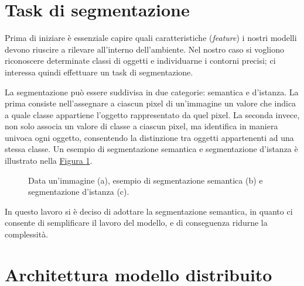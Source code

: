 \documentclass[12pt]{report}
\begin{document}
\section{Task di segmentazione}
\label{sec:task_di_segmentazione}

Prima di iniziare è essenziale capire quali caratteristiche (\textit{feature}) i nostri modelli devono riuscire a rilevare all'interno dell'ambiente. Nel nostro caso si vogliono riconoscere determinate classi di oggetti e individuarne i contorni precisi; ci interessa quindi effettuare un task di segmentazione.

La segmentazione può essere suddivisa in due categorie: semantica e d'istanza. La prima consiste nell'assegnare a ciascun pixel di un'immagine un valore che indica a quale classe appartiene l'oggetto rappresentato da quel pixel. La seconda invece, non solo associa un valore di classe a ciascun pixel, ma identifica in maniera univoca ogni oggetto, consentendo la distinzione tra oggetti appartenenti ad una stessa classe. Un esempio di segmentazione semantica e segmentazione d'istanza è illustrato nella \hyperref[fig:segmentazione]{Figura \ref{fig:segmentazione}}.

\begin{figure}[t]
	\centering
	\hspace{0.01\textwidth}
	\hspace{0.01\textwidth}
	\caption{Data un'immagine (a), esempio di segmentazione semantica (b) e segmentazione d'istanza (c).}
	\label{fig:segmentazione}
\end{figure}

In questo lavoro si è deciso di adottare la segmentazione semantica, in quanto ci consente di semplificare il lavoro del modello, e di conseguenza ridurne la complessità.

\section{Architettura modello distribuito}
\label{sec:modello_per_fog_robotics}
\end{document}

